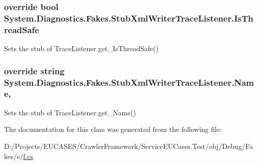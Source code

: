 \hypertarget{class_system_1_1_diagnostics_1_1_fakes_1_1_stub_xml_writer_trace_listener_a9b78df9524d0a4cf46c4ced5c3d94cd2}{
\subsubsection[{Is\-Thread\-Safe}]{\setlength{\rightskip}{0pt plus 5cm}override bool System.\-Diagnostics.\-Fakes.\-Stub\-Xml\-Writer\-Trace\-Listener.\-Is\-Thread\-Safe\hspace{0.3cm}{\ttfamily [get]}}}\label{class_system_1_1_diagnostics_1_1_fakes_1_1_stub_xml_writer_trace_listener_a9b78df9524d0a4cf46c4ced5c3d94cd2}


Sets the stub of Trace\-Listener.\-get\-\_\-\-Is\-Thread\-Safe()

\hypertarget{class_system_1_1_diagnostics_1_1_fakes_1_1_stub_xml_writer_trace_listener_a8893f0382f609c4adf97e03f3fa579b7}{
\subsubsection[{Name}]{\setlength{\rightskip}{0pt plus 5cm}override string System.\-Diagnostics.\-Fakes.\-Stub\-Xml\-Writer\-Trace\-Listener.\-Name\hspace{0.3cm}{\ttfamily [get]}, {\ttfamily [set]}}}\label{class_system_1_1_diagnostics_1_1_fakes_1_1_stub_xml_writer_trace_listener_a8893f0382f609c4adf97e03f3fa579b7}


Sets the stub of Trace\-Listener.\-get\-\_\-\-Name()



The documentation for this class was generated from the following file\-:\begin{DoxyCompactItemize}
\item 
D\-:/\-Projects/\-E\-U\-C\-A\-S\-E\-S/\-Crawler\-Framework/\-Service\-E\-U\-Cases.\-Test/obj/\-Debug/\-Fakes/s/\hyperlink{s_2f_8cs}{f.\-cs}\end{DoxyCompactItemize}

